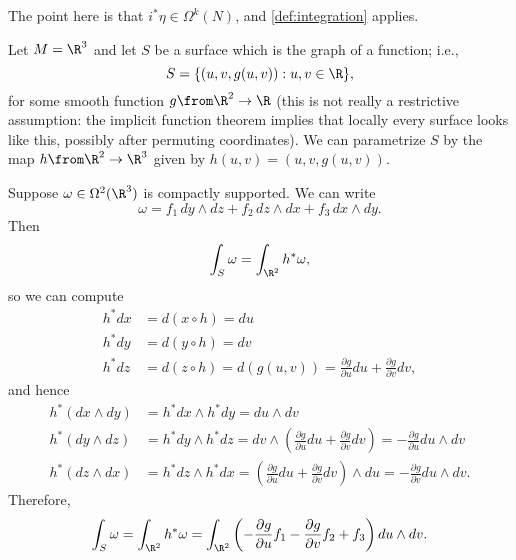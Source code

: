 The point here is that $i^\ast \eta \in \Omega^k(N)$, and \cref{def:integration} applies.

\begin{example}
	Let $M = \R^3$ and let $S$ be a surface which is the graph of a function; i.e.,
	\[
		S = \{(u,v,g(u,v)) : u,v \in \R\},
	\]
	for some smooth function $g \from \R^2 \to \R$ (this is not really a restrictive assumption: the implicit function theorem implies that locally every surface looks like this, possibly after permuting coordinates). We can parametrize $S$ by the map $h \from \R^2 \to \R^3$ given by $h(u,v) = (u,v,g(u,v))$.
	
	Suppose $\omega \in \Omega^2(\R^3)$ is compactly supported. We can write
	\[
		\omega = f_1 \, dy\wedge dz + f_2 \, dz \wedge dx + f_3 \, dx \wedge dy.
	\]
	Then
	\[
		\int_S \omega = \int_{\R^2} h^\ast \omega,
	\]
	so we can compute
	\begin{align*}
		h^\ast dx & = d(x \circ h) = du \\
		h^\ast dy & = d(y \circ h) = dv \\
		h^\ast dz & = d(z \circ h) = d(g(u,v)) = \frac{\partial g}{\partial u} du + \frac{\partial g}{\partial v} dv,
	\end{align*}
	and hence
	\begin{align*}
		h^\ast (dx \wedge dy) & = h^\ast dx \wedge h^\ast dy = du \wedge dv \\
		h^\ast (dy \wedge dz) & = h^\ast dy \wedge h^\ast dz = dv \wedge \left(\frac{\partial g}{\partial u} du + \frac{\partial g}{\partial v} dv \right) = -\frac{\partial g}{\partial u} du  \wedge dv \\
		h^\ast (dz \wedge dx) & = h^\ast dz \wedge h^\ast dx = \left( \frac{\partial g}{\partial u} du + \frac{\partial g}{\partial v} dv\right) \wedge du = -\frac{\partial g}{\partial v} du \wedge dv.
	\end{align*}
	Therefore,
	\begin{equation}\label{eq:surface integral formula} 
		\int_S \omega = \int_{\R^2} h^\ast \omega = \int_{\R^2} \left( -\frac{\partial g}{\partial u}f_1 -\frac{\partial g}{\partial v}f_2 + f_3\right) du \wedge dv.
	\end{equation}
	

\end{example}
